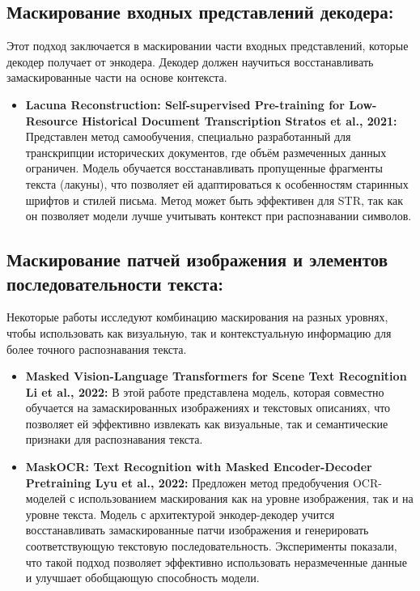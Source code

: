 \subsection{Маскирование входных представлений декодера:}
Этот  подход  заключается  в  маскировании  части  входных  представлений,  которые  декодер  получает  от  энкодера.  Декодер  должен  научиться  восстанавливать  замаскированные  части  на  основе  контекста.
\begin{itemize}
    \item  \textbf{Lacuna Reconstruction: Self-supervised Pre-training for Low-Resource Historical Document Transcription Stratos et al., 2021:} Представлен  метод  самообучения,  специально  разработанный  для  транскрипции  исторических  документов,  где  объём  размеченных  данных  ограничен.  Модель  обучается  восстанавливать  пропущенные  фрагменты  текста  (лакуны),  что  позволяет  ей  адаптироваться  к  особенностям  старинных  шрифтов  и  стилей  письма.
    Метод  может  быть  эффективен  для  STR,  так  как  он  позволяет  модели  лучше  учитывать  контекст  при  распознавании  символов.
\end{itemize}

\subsection{Маскирование  патчей  изображения  и  элементов  последовательности  текста:}  Некоторые  работы  исследуют  комбинацию  маскирования  на  разных  уровнях,  чтобы  использовать  как  визуальную,  так  и  контекстуальную  информацию  для  более  точного  распознавания  текста. 
\begin{itemize}
    \item \textbf{Masked Vision-Language Transformers for Scene Text Recognition Li et al., 2022:}  В  этой  работе представлена  модель,  которая  совместно  обучается  на  замаскированных  изображениях  и  текстовых  описаниях,  что  позволяет  ей  эффективно  извлекать  как  визуальные,  так  и  семантические  признаки  для  распознавания  текста.
    \item \textbf{MaskOCR: Text Recognition with Masked Encoder-Decoder Pretraining Lyu et al., 2022:}  Предложен  метод  предобучения  OCR-моделей  с  использованием  маскирования  как  на  уровне  изображения,  так  и  на  уровне  текста.  Модель  с  архитектурой  энкодер-декодер  учится  восстанавливать  замаскированные  патчи  изображения  и  генерировать  соответствующую  текстовую  последовательность.  Эксперименты  показали,  что  такой  подход  позволяет  эффективно  использовать  неразмеченные  данные  и  улучшает  обобщающую  способность  модели.
\end{itemize}

